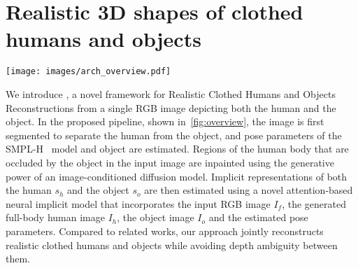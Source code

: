 \section{Realistic 3D shapes of clothed humans and objects}
\label{sec:method}
\begin{figure*}
  \centering
\texttt{[image: images/arch\_overview.pdf]}
\vspace{-8mm}
\caption{\name overview: Given an input image of a human-object scene, we first use a generative model to inpaint occluded human body regions, guided by a mask of missing areas and the segmented input of the human. Next, the generated image, along with an estimated normal map, the input image, the segmented object image, and estimated pose parameters, are processed by an attention-based neural implicit model. This model jointly estimates the implicit representation of the human-object shape.}
\label{fig:overview}
\vspace{-5mm}
\end{figure*}
We introduce \name, a novel framework for Realistic Clothed Humans and Objects Reconstructions from a single RGB image depicting both the human and the object. In the proposed pipeline, shown in~\cref{fig:overview}, the image is first segmented to separate the human from the object, and pose parameters of the SMPL-H~\cite{smplh} model and object are estimated. Regions of the human body that  are occluded by the object in the input image are inpainted using the generative power of an image-conditioned diffusion model. Implicit representations of both the human $s_h$ and the object $s_o$ are then estimated using a novel attention-based neural implicit model that incorporates the input RGB image $I_f$, the generated full-body human image $I_h$, the object image $I_o$ and the estimated pose parameters. Compared to related works, our approach jointly reconstructs realistic clothed humans and objects while avoiding depth ambiguity between them.
%
